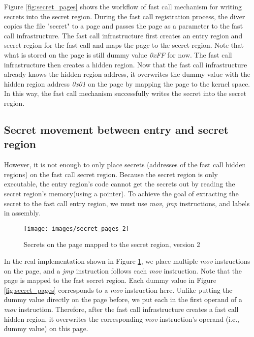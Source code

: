 Figure \ref{fig:secret_pages} shows the workflow of fast call mechanism for writing secrets into the secret region. 
During the fast call registration process,
the diver copies the file "secret" to a page and passes the page as a parameter to
 the fast call infrastructure. The fast call infrastructure first creates an entry 
 region and secret region for the fast call and maps the page to the secret region. 
 Note that what is stored on the page is still dummy value \emph{0xFF} for now. The fast call 
 infrastructure then creates a hidden region. Now that the fast call infrastructure 
 already knows the hidden region address, it overwrites the dummy value with the hidden 
 region address \emph{0x01} on the page by mapping the page to the kernel space. In this way, the fast call mechanism 
 successfully writes the secret into the secret region.


 \subsection{Secret movement between entry and secret region}
 However, it is not enough to only place secrets
 (addresses of the fast call hidden regions) on the fast call secret region. 
 Because the secret region is only executable, the entry region's code cannot 
 get the secrets out by reading the secret region's memory(using a pointer).
To achieve the goal of extracting the secret to the fast call entry region, 
  we must use \emph{mov}, \emph{jmp} instructions, and labels in assembly.

 \begin{figure}[tbp]
   \centering
   \texttt{[image: images/secret\_pages\_2]}
   \caption[Secrets on the page mapped to the secret region, version 2]{Secrets on the page mapped to the secret region, version 2}
    \label{fig:secret_pages_2}
 \end{figure}
  
 In the real implementation shown in Figure \ref{fig:secret_pages_2}, 
 we place multiple \emph{mov} instructions on the page,
 and a \emph{jmp} instruction follows each \emph{mov} instruction. Note that the page is mapped to the fast secret region. 
 Each dummy value in Figure \ref{fig:secret_pages} corresponds to a \emph{mov} instruction here. Unlike putting the 
 dummy value directly on the page before, we put each in the first operand of
  a \emph{mov} instruction. Therefore, after the fast call infrastructure creates a fast 
  call hidden region, it overwrites the corresponding \emph{mov} instruction's 
  operand (i.e., dummy value) on this page.  


